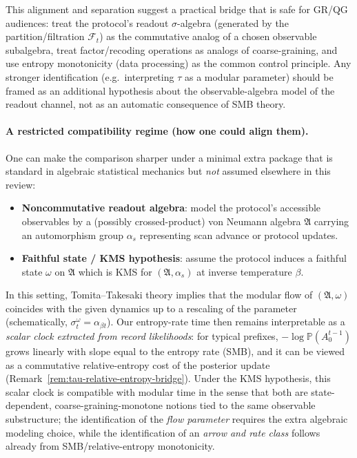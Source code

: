 This alignment and separation suggest a practical bridge that is safe for GR/QG audiences: treat the protocol's readout $\sigma$-algebra (generated by the partition/filtration $\mathcal{F}_t$) as the commutative analog of a chosen observable subalgebra, treat factor/recoding operations as analogs of coarse-graining, and use entropy monotonicity (data processing) as the common control principle. Any stronger identification (e.g.\ interpreting $\tau$ as a modular parameter) should be framed as an additional hypothesis about the observable-algebra model of the readout channel, not as an automatic consequence of SMB theory.\cite{Takesaki2003}

\paragraph{A restricted compatibility regime (how one could align them).}
One can make the comparison sharper under a minimal extra package that is standard in algebraic statistical mechanics but \emph{not} assumed elsewhere in this review:
\begin{itemize}[leftmargin=*,itemsep=2pt]
  \item \textbf{Noncommutative readout algebra}: model the protocol's accessible observables by a (possibly crossed-product) von Neumann algebra $\mathfrak{A}$ carrying an automorphism group $\alpha_s$ representing scan advance or protocol updates.
  \item \textbf{Faithful state / KMS hypothesis}: assume the protocol induces a faithful state $\omega$ on $\mathfrak{A}$ which is KMS for $(\mathfrak{A},\alpha_s)$ at inverse temperature $\beta$.
\end{itemize}
In this setting, Tomita--Takesaki theory implies that the modular flow of $(\mathfrak{A},\omega)$ coincides with the given dynamics up to a rescaling of the parameter (schematically, $\sigma_t^\omega=\alpha_{\beta t}$).\cite{Takesaki2003}
Our entropy-rate time then remains interpretable as a \emph{scalar clock extracted from record likelihoods}: for typical prefixes, $-\log \mathbb{P}(A_0^{t-1})$ grows linearly with slope equal to the entropy rate (SMB), and it can be viewed as a commutative relative-entropy cost of the posterior update (Remark~\ref{rem:tau-relative-entropy-bridge}).
Under the KMS hypothesis, this scalar clock is compatible with modular time in the sense that both are state-dependent, coarse-graining-monotone notions tied to the same observable substructure; the identification of the \emph{flow parameter} requires the extra algebraic modeling choice, while the identification of an \emph{arrow and rate class} follows already from SMB/relative-entropy monotonicity.

